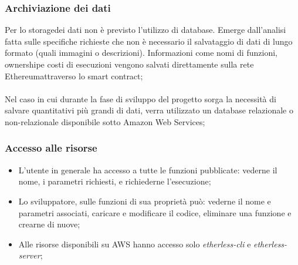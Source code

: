 \subsubsection{Archiviazione dei dati}
Per lo storage\glo dei dati non è previsto l'utilizzo di database. Emerge dall'analisi fatta sulle specifiche richieste che non è necessario il salvataggio di dati di lungo formato (quali immagini o descrizioni). Informazioni come nomi di funzioni, ownership\glo e costi di esecuzioni vengono salvati direttamente sulla rete Ethereum\glo attraverso lo smart contract\glo; 
\\\\
Nel caso in cui durante la fase di sviluppo del progetto sorga la necessità di salvare quantitativi più grandi di dati, verra utilizzato un database relazionale o non-relazionale disponibile sotto Amazon Web Services;
\subsubsection{Accesso alle risorse}
\begin{itemize}
	\item L'utente in generale ha accesso a tutte le funzioni pubblicate: vederne il nome, i parametri richiesti, e richiederne l'esecuzione;
	\item Lo sviluppatore, sulle funzioni di sua proprietà può: vederne il nome e parametri associati, caricare e modificare il codice, eliminare una funzione e crearne di nuove;
	\item Alle risorse disponibili su AWS hanno accesso solo \textit{etherless-cli} e \textit{etherless-server};
\end{itemize}
